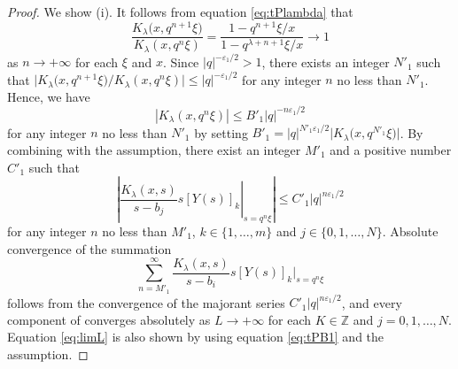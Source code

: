 \documentclass[pdftex]{sigma}
\numberwithin{equation}{section}
\theoremstyle{definition}
\begin{document}
\begin{proof}
We show (i).
It follows from equation \eqref{eq:tPlambda} that
\begin{equation*}
\frac{K_{\lambda}\bigl(x, q^{n+1} \xi \bigr)}{K_{\lambda}(x, q^{n} \xi )} = \frac{1- q^{ n+1}\xi /x }{1- q^{\lambda +n+1}\xi /x } \to 1
\end{equation*}
as $n \to +\infty $ for each $\xi $ and $x$.
Since $|q| ^{-\varepsilon _1 /2} >1$, there exists an integer $N'_{1} $ such that $\big| K_{\lambda}\bigl(x, q^{n+1} \xi \bigr) / K_{\lambda}(x, q^{n} \xi )\big| \leq |q| ^{-\varepsilon _1 /2} $ for any integer $n$ no less than $N'_{1} $.
Hence, we have
\begin{equation}
| K_{\lambda}(x, q^{n } \xi ) | \leq B' _1 |q|^{-n \varepsilon _1 /2 }
\label{eq:tPB1}
\end{equation}
for any integer $n$ no less than $N'_{1} $ by setting $B' _1 = |q|^{N'_{1} \varepsilon _1 /2 } \big| K_{\lambda}\bigl(x, q^{N'_{1} } \xi \bigr) \big| $.
By combining with the assumption, there exist an integer $M' _1$ and a positive number $C' _1 $ such that
\begin{equation*}
\left|\left. \frac{ K_{\lambda}(x, s)}{s-b_{j}} s [Y(s)]_k \right| _{s= q^{n}\xi } \right|\leq C'_1 |q |^{ n \varepsilon _1 /2 }
\end{equation*}
for any integer $ n$ no less than $ M'_1 $, $k \in \{ 1, \dots , m \}$ and $j \in \{ 0, 1, \dots , N \}$.
Absolute convergence of the summation
\begin{equation*}
\sum _{n=M'_1}^{\infty } \frac{ K_{\lambda}(x, s)}{s-b_{i}} s[Y(s)]_k |_{s= q^{n}\xi }
\end{equation*}
follows from the convergence of the majorant series $C'_1 |q |^{ n \varepsilon _1 /2 }$, and every component of  converges absolutely as $L \to +\infty $ for each $K \in \mathbb{Z} $ and $j=0,1,\dots ,N$.
Equation \eqref{eq:limL} is also shown by using equation \eqref{eq:tPB1} and the assumption.


\end{proof}
\end{document}
